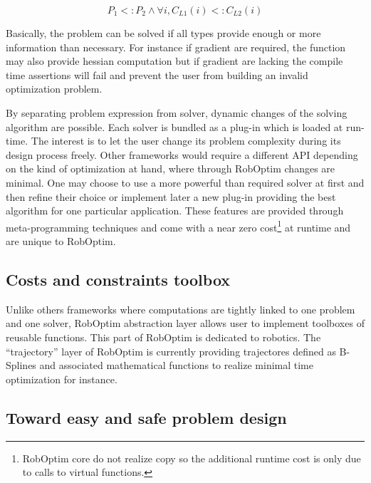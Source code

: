 \documentclass[conference,final,a4paper,twocolumn,9pt]{IEEEtran}
\begin{document}
\begin{equation}
  P_1 <: P_2 \wedge \forall i, C_{L1}(i) <: C_{L2}(i)
\end{equation}


Basically, the problem can be solved if all types provide enough or
more information than necessary. For instance if gradient are
required, the function may also provide hessian computation but if
gradient are lacking the compile time assertions will fail and prevent
the user from building an invalid optimization problem.

By separating problem expression from solver, dynamic changes of the
solving algorithm are possible. Each solver is bundled as a plug-in
which is loaded at run-time. The interest is to let the user change
its problem complexity during its design process freely. Other
frameworks would require a different API depending on the kind of
optimization at hand, where through RobOptim changes are minimal. One
may choose to use a more powerful than required solver at first and
then refine their choice or implement later a new plug-in providing
the best algorithm for one particular application. These features are
provided through meta-programming techniques and come with a near zero
cost\footnote{RobOptim core do not realize copy so the additional
  runtime cost is only due to calls to virtual functions.} at runtime
and are unique to RobOptim.

\subsection{Costs and constraints toolbox}


Unlike others frameworks where computations are tightly linked to one
problem and one solver, RobOptim abstraction layer allows user to
implement toolboxes of reusable functions. This part of RobOptim is
dedicated to robotics. The ``trajectory'' layer of RobOptim is
currently providing trajectores defined as B-Splines and associated
mathematical functions to realize minimal time optimization for
instance.


\subsection{Toward easy and safe problem design}
\end{document}
